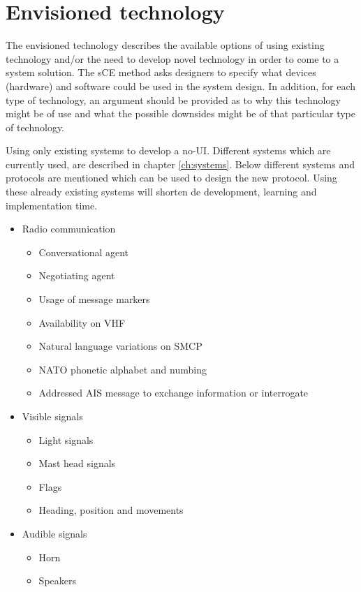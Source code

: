 \section{Envisioned technology}
The envisioned technology describes the available options of using existing technology and/or the need to develop novel technology in order to come to a system solution. The sCE method asks designers to specify what devices (hardware) and software could be used in the system design. In addition, for each type of technology, an argument should be provided as to why this technology might be of use and what the possible downsides might be of that particular type of technology.

Using only existing systems to develop a \acf{no-UI}. Different systems which are currently used, are described in chapter \ref{ch:systems}. Below different systems and protocols are mentioned which can be used to design the new protocol. Using these already existing systems will shorten de development, learning and implementation time.

\begin{itemize}
	\item Radio communication
	\begin{itemize}
		\item Conversational agent
		\item Negotiating agent
		\item Usage of message markers
		\item Availability on \ac{VHF}
		\item Natural language variations on \ac{SMCP}
		\item NATO phonetic alphabet and numbing
		\item Addressed \ac{AIS} message to exchange information or interrogate
	\end{itemize}
	\item Visible signals
	\begin{itemize}
		\item Light signals
		\item Mast head signals
		\item Flags
		\item Heading, position and movements
	\end{itemize}
	\item Audible signals
	\begin{itemize}
		\item Horn
		\item Speakers
	\end{itemize}
\end{itemize}

